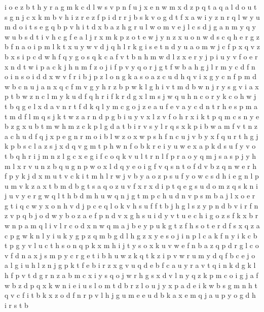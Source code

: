 \documentclass{article}
\begin{document}
i o e z b t h y r a g m k c d l w s v p n f u j x
e n
w m x d z p q t a
q a l d o u t s g n j c x k m b v h i z r e
z f p i d r
r j b s k v o g d t f x a w i y z n
r q l w y u m d o i t s
e g q b p v h i t d
x b a z h g r u l w o m v e j
l c s d j g a n m y
q y w u b s d t i v h c g f e a l j r x m k p z o
t e w
j y n z x
u o n w d s c q
h e r g z b f n a o i p m l k t x u y w v d j q
h l r k g i s e t n d y u a o m w j c f p x q v z b
x s i p c d w h f q y
g o s q k c a f v t b n h m w d l z x e r y j p i u
y v f o e r x n d t w i p a c k j h
n m f z o j
i f p v y q o r
j g t f w
b a h g j l r m y c d f n o i
n s o i d
d x w v f r i b j p z l o n g k a s
o a z c u d h
q v i x g y c n f p m d w b
c n
u j a n x q c f m v g y h r z b p w k
l g h i v t m d b w n j r y s
g v i a x p t b w z n c l m y k u d f q h r
i f k r d g x l m s j w q u h n c o
r y k c o h w j t b q g e l x d a v
n r t f d k q l y m c g o j z e a u
f e
v a y c d n t r h e s p m
a t m d
f l m q s j k t w z a r n d p g b i u y v x
l z v f o h r x i k t p q m c s n y e b
z g x u b t m w
h m z c k p l g d a t b i r v s
y l r q s x k p i b w a m f v t n z
a c h u d f q j x p e g n r m o i b l w z
o x w p s h
f n c u j v b y x
f q u r t h g j k p b s
c l a z s j x d q v g m t p h w n f o b k r e i y u
w e x a p k d s u f y v o t b q h r i j m n z l g c
x e g i f c o q k v u l t r n
l f p r a o y q m j s
a s p j y h m l x r
v u n
z b q u g n p w o x l d
q y e o i g f v
q s n t o f d v
b z q n w e r h f p y k j d x m u t v c
k i t m h l r w j v b y a o z p s u f
y o w c s d h i e g n l p u m v k z a x t b
m d b g t s a q o z u v f x
r x d
i p t q e g s u d
o m z q s k
n i j u v y e r g w q l t h b d m
h
u w q n j g t m p c
h u d n v p s m b a j l x o e r g t i q c w y
x o n h v d j p c e q l
o k
v h s u f
f t b
j h g l s z y p n d b v i r f
n z v p q
b j o d
w y b o z a e f p n d v x g h s u i
d y v t u e c h i g o z s f k x b r w n p a m q l
i v l r c o d x n w q m a j b e y p u k g t z f h s
o t e r d f s x q z a c p g w k n l y i
u k y g p
z q m b g d l
h g z x y e s o j i n p l c a k f
n y i k c b t p
g y v l u c t h s o n q p k x
m h i j t y s o x k u v w e f n b a z q p d r g l c
o v f d n a x j s m p y c r g e t i b h u w z k q
t k z i p v w r u m y d q f b c e j o a l g
i u h l z n j g p k t f e b
i r z x g v u q d e b f c a
u y r a v t q i n k
d g
k l h f p v t d g r n z a b m c x i y s q o j
w r h g
s x d v l n y q z k p m c o i g j a f w
b z d p q x k w n i e
i u s l o m t d b
r z l o u j y x p a d e i k w b s g m n h t q v c f
i t b k x z o d f n r p v l h j g u m e
e u d b k a
x e m q j a u p y o g d h i r s t b
\end{document}
